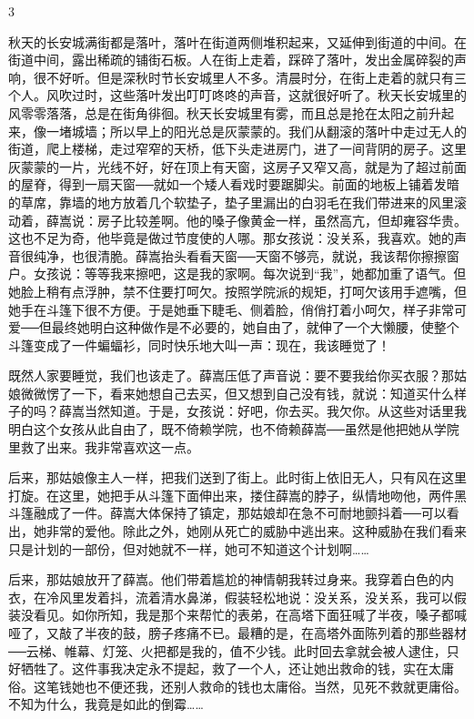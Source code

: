 3 

秋天的长安城满街都是落叶，落叶在街道两侧堆积起来，又延伸到街道的中间。在街道中间，露出稀疏的铺街石板。人在街上走着，踩碎了落叶，发出金属碎裂的声响，很不好听。但是深秋时节长安城里人不多。清晨时分，在街上走着的就只有三个人。风吹过时，这些落叶发出叮叮咚咚的声音，这就很好听了。秋天长安城里的风零零落落，总是在街角徘徊。秋天长安城里有雾，而且总是抢在太阳之前升起来，像一堵城墙；所以早上的阳光总是灰蒙蒙的。我们从翻滚的落叶中走过无人的街道，爬上楼梯，走过窄窄的天桥，低下头走进房门，进了一间背阴的房子。这里灰蒙蒙的一片，光线不好，好在顶上有天窗，这房子又窄又高，就是为了超过前面的屋脊，得到一扇天窗──就如一个矮人看戏时要踞脚尖。前面的地板上铺着发暗的草席，靠墙的地方放着几个软垫子，垫子里漏出的白羽毛在我们带进来的风里滚动着，薛嵩说：房子比较差啊。他的嗓子像黄金一样，虽然高亢，但却雍容华贵。这也不足为奇，他毕竟是做过节度使的人哪。那女孩说：没关系，我喜欢。她的声音很纯净，也很清脆。薛嵩抬头看看天窗──天窗不够亮，就说，我该帮你擦擦窗户。女孩说：等等我来擦吧，这是我的家啊。每次说到“我”，她都加重了语气。但她脸上稍有点浮肿，禁不住要打呵欠。按照学院派的规矩，打呵欠该用手遮嘴，但她手在斗篷下很不方便。于是她垂下睫毛、侧着脸，俏俏打着小呵欠，样子非常可爱──但最终她明白这种做作是不必要的，她自由了，就伸了一个大懒腰，使整个斗篷变成了一件蝙蝠衫，同时快乐地大叫一声：现在，我该睡觉了！ 

既然人家要睡觉，我们也该走了。薛嵩压低了声音说：要不要我给你买衣服？那姑娘微微愣了一下，看来她想自己去买，但又想到自己没有钱，就说：知道买什么样子的吗？薛嵩当然知道。于是，女孩说：好吧，你去买。我欠你。从这些对话里我明白这个女孩从此自由了，既不倚赖学院，也不倚赖薛嵩──虽然是他把她从学院里救了出来。我非常喜欢这一点。 

后来，那姑娘像主人一样，把我们送到了街上。此时街上依旧无人，只有风在这里打旋。在这里，她把手从斗篷下面伸出来，搂住薛嵩的脖子，纵情地吻他，两件黑斗篷融成了一件。薛嵩大体保持了镇定，那姑娘却在急不可耐地颤抖着──可以看出，她非常的爱他。除此之外，她刚从死亡的威胁中逃出来。这种威胁在我们看来只是计划的一部份，但对她就不一样，她可不知道这个计划啊…… 

后来，那姑娘放开了薛嵩。他们带着尴尬的神情朝我转过身来。我穿着白色的内衣，在冷风里发着抖，流着清水鼻涕，假装轻松地说：没关系，没关系，我可以假装没看见。如你所知，我是那个来帮忙的表弟，在高塔下面狂喊了半夜，嗓子都喊哑了，又敲了半夜的鼓，膀子疼痛不已。最糟的是，在高塔外面陈列着的那些器材──云梯、帷幕、灯笼、火把都是我的，值不少钱。此时回去拿就会被人逮住，只好牺牲了。这件事我决定永不提起，救了一个人，还让她出救命的钱，实在太庸俗。这笔钱她也不便还我，还别人救命的钱也太庸俗。当然，见死不救就更庸俗。不知为什么，我竟是如此的倒霉…… 

